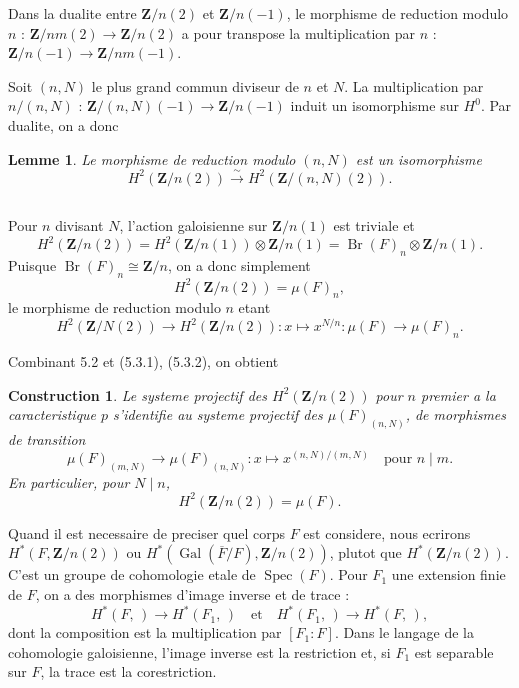 \documentclass[11pt,a4paper]{article}
\theoremstyle{plain}
\newtheorem{lemma}[theorem]{Lemme}
\newtheorem{construction}[theorem]{Construction}
\theoremstyle{definition}
\DeclareMathOperator{\Gal}{Gal}
\DeclareMathOperator{\Spec}{Spec}
\DeclareMathOperator{\Br}{Br}
\begin{document}
Dans la dualite entre $\mathbf{Z}/n(2)$ et $\mathbf{Z}/n(-1)$, le morphisme de reduction modulo $n$ : $\mathbf{Z}/nm(2) \to \mathbf{Z}/n(2)$ a pour transpose la multiplication par $n$ : $\mathbf{Z}/n(-1) \to \mathbf{Z}/nm(-1)$.

Soit $(n, N)$ le plus grand commun diviseur de $n$ et $N$. La multiplication par $n/(n, N)$ : $\mathbf{Z}/(n, N)(-1) \to \mathbf{Z}/n(-1)$ induit un isomorphisme sur $H^0$. Par dualite, on a donc

\begin{lemma}\label{5.2}
Le morphisme de reduction modulo $(n, N)$ est un isomorphisme
\[
H^2(\mathbf{Z}/n(2)) \xrightarrow{\sim} H^2(\mathbf{Z}/(n, N)(2)).
\]
\end{lemma}

\subsection{}\label{5.3}

Pour $n$ divisant $N$, l'action galoisienne sur $\mathbf{Z}/n(1)$ est triviale et
\[
H^2(\mathbf{Z}/n(2)) = H^2(\mathbf{Z}/n(1)) \otimes \mathbf{Z}/n(1) = \Br(F)_n \otimes \mathbf{Z}/n(1).
\]
Puisque $\Br(F)_n \cong \mathbf{Z}/n$, on a donc simplement
\begin{equation}\label{5.3.1}
H^2(\mathbf{Z}/n(2)) = \mu(F)_n,
\end{equation}
le morphisme de reduction modulo $n$ etant
\begin{equation}\label{5.3.2}
H^2(\mathbf{Z}/N(2)) \to H^2(\mathbf{Z}/n(2)) : x \mapsto x^{N/n} : \mu(F) \to \mu(F)_n.
\end{equation}

Combinant 5.2 et (5.3.1), (5.3.2), on obtient

\begin{construction}\label{5.4}
Le systeme projectif des $H^2(\mathbf{Z}/n(2))$ pour $n$ premier a la caracteristique $p$ s'identifie au systeme projectif des $\mu(F)_{(n,N)}$, de morphismes de transition
\[
\mu(F)_{(m,N)} \to \mu(F)_{(n,N)} : x \mapsto x^{(n,N)/(m,N)} \quad \text{pour } n \mid m.
\]
En particulier, pour $N \mid n$,
\begin{equation}\label{5.4.1}
H^2(\mathbf{Z}/n(2)) = \mu(F).
\end{equation}
\end{construction}

Quand il est necessaire de preciser quel corps $F$ est considere, nous ecrirons $H^*(F, \mathbf{Z}/n(2))$ ou $H^*(\Gal(\overline{F}/F), \mathbf{Z}/n(2))$, plutot que $H^*(\mathbf{Z}/n(2))$. C'est un groupe de cohomologie etale de $\Spec(F)$. Pour $F_1$ une extension finie de $F$, on a des morphismes d'image inverse et de trace :
\[
H^*(F, \,) \to H^*(F_1, \,) \quad \text{et} \quad H^*(F_1, \,) \to H^*(F, \,),
\]
dont la composition est la multiplication par $[F_1 : F]$. Dans le langage de la cohomologie galoisienne, l'image inverse est la restriction et, si $F_1$ est separable sur $F$, la trace est la corestriction.
\end{document}
